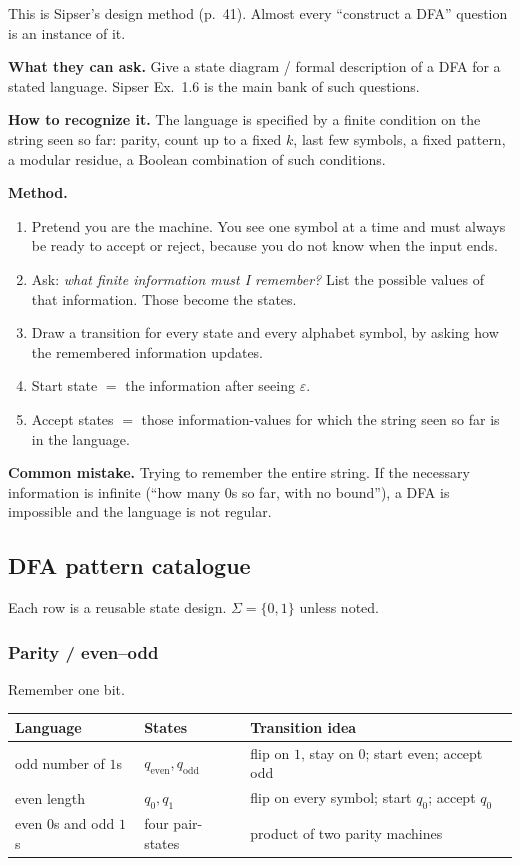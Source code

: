 \documentclass[11pt,a4paper]{article}
\newcommand{\eps}{\varepsilon}
\begin{document}
This is Sipser's design method (p.~41). Almost every ``construct a DFA''
question is an instance of it.

\textbf{What they can ask.}
Give a state diagram / formal description of a DFA for a stated language.
Sipser Ex.~1.6 is the main bank of such questions.

\textbf{How to recognize it.}
The language is specified by a finite condition on the string seen so far:
parity, count up to a fixed $k$, last few symbols, a fixed pattern, a
modular residue, a Boolean combination of such conditions.

\textbf{Method.}
\begin{enumerate}
  \item Pretend you are the machine. You see one symbol at a time and must
        always be ready to accept or reject, because you do not know when
        the input ends.
  \item Ask: \emph{what finite information must I remember?} List the
        possible values of that information. Those become the states.
  \item Draw a transition for every state and every alphabet symbol, by
        asking how the remembered information updates.
  \item Start state $=$ the information after seeing $\eps$.
  \item Accept states $=$ those information-values for which the string
        seen so far is in the language.
\end{enumerate}

\textbf{Common mistake.}
Trying to remember the entire string. If the necessary information is
infinite (``how many $0$s so far, with no bound''), a DFA is impossible
and the language is not regular.

\subsection{DFA pattern catalogue}

Each row is a reusable state design. $\Sigma=\{0,1\}$ unless noted.

\subsubsection{Parity / even--odd}

Remember one bit.

\begin{center}
\begin{tabular}{@{}llp{7.4cm}@{}}
\toprule
Language & States & Transition idea \\
\midrule
odd number of $1$s & $q_{\mathrm{even}},q_{\mathrm{odd}}$ &
flip on $1$, stay on $0$; start even; accept odd \\
even length & $q_0,q_1$ & flip on every symbol; start $q_0$; accept $q_0$ \\
even $0$s and odd $1$s & four pair-states & product of two parity machines \\
\bottomrule
\end{tabular}
\end{center}
\end{document}

